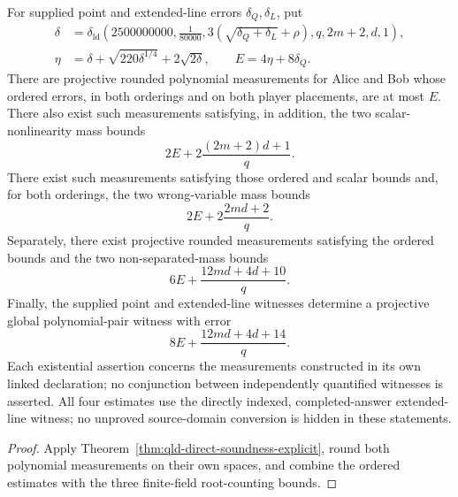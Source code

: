 \begin{theorem}
\label{thm:qld-rounded-polynomials-explicit}
\leanok
{}
For supplied point and extended-line errors $\delta_Q,\delta_L$, put
\[
 \begin{split}
 \delta&=\delta_{\mathrm{ld}}\left(2500000000,\frac1{80000},
   3(\sqrt{\delta_Q+\delta_L}+\rho),q,2m+2,d,1\right),\\
 \eta&=\delta+\sqrt{220\delta^{1/4}}+2\sqrt{2\delta},
 \qquad E=4\eta+8\delta_Q.
 \end{split}
\]
There are projective rounded polynomial measurements for Alice and Bob whose
ordered errors, in both orderings and on both player placements, are at most
$E$.  There also exist such measurements satisfying, in addition, the two
scalar-nonlinearity mass bounds
\[
 2E+2\frac{(2m+2)d+1}{q}.
\]
There exist such measurements satisfying those ordered and scalar bounds and,
for both orderings, the two wrong-variable mass bounds
\[
 2E+2\frac{2md+2}{q}.
\]
Separately, there exist projective rounded measurements satisfying the ordered
bounds and the two non-separated-mass bounds
\[
 6E+\frac{12md+4d+10}{q}.
\]
Finally, the supplied point and extended-line witnesses determine a projective
global polynomial-pair witness with error
\[
 8E+\frac{12md+4d+14}{q}.
\]
Each existential assertion concerns the measurements constructed in its own
linked declaration; no conjunction between independently quantified witnesses
is asserted.  All four estimates use the directly indexed, completed-answer
extended-line witness; no unproved source-domain conversion is hidden in these
statements.
\end{theorem}
\begin{proof}
\leanok
Apply Theorem~\ref{thm:qld-direct-soundness-explicit}, round both polynomial
measurements on their own spaces, and combine the ordered estimates with the
three finite-field root-counting bounds.
\end{proof}

